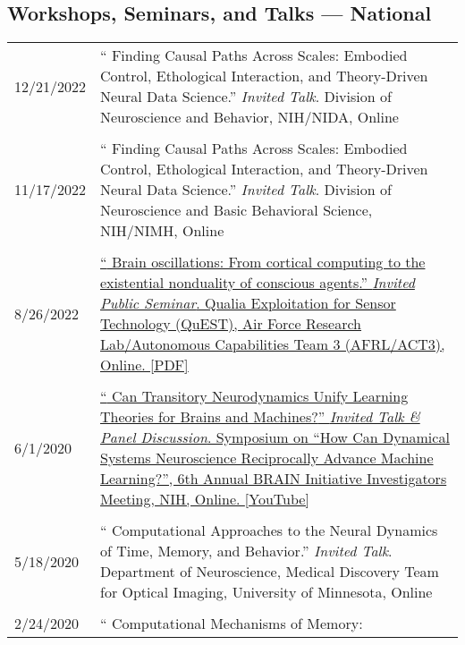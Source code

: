 \documentclass[10pt]{article}
\newcommand{\itemtitle}[1]{{\color{hopkinsblue}\ul{#1}}}
\newcommand{\unpubtitle}[1]{{\color{hopkinsblue} #1}}
\begin{document}
\subsection*{Workshops, Seminars, and Talks --- National}
\label{talks:natl}

\begin{longtable}{@{\hspace{0.2in}}l>{\raggedright\arraybackslash}p{}}
  12/21/2022 \hspace{0.3in} & ``\unpubtitle{Finding Causal Paths Across Scales:
  Embodied Control, Ethological Interaction, and Theory-Driven Neural Data
  Science}.'' \emph{Invited Talk}. Division of Neuroscience and Behavior,
  NIH/NIDA, Online\\
  \tabularnewline
  11/17/2022 \hspace{0.3in} & ``\unpubtitle{Finding Causal Paths Across Scales:
  Embodied Control, Ethological Interaction, and Theory-Driven Neural Data
  Science}.'' \emph{Invited Talk}. Division of Neuroscience and Basic Behavioral
  Science, NIH/NIMH, Online\\
  \tabularnewline
  8/26/2022 \hspace{0.3in} &
  \href{https://jdmonaco.com/files/monaco-2022-afrl-quest-slides.pdf}
  {``\unpubtitle{Brain oscillations: From cortical computing to the existential
  nonduality of conscious agents}.'' \emph{Invited Public Seminar}. Qualia
  Exploitation for Sensor Technology (QuEST), Air Force Research Lab/Autonomous
  Capabilities Team 3 (AFRL/ACT3), Online. \itemtitle{[PDF]}}\\
  \tabularnewline
  6/1/2020 \hspace{0.3in} &
  \href{https://youtu.be/2jy1ENYHRAw?t=902}{``\unpubtitle{Can Transitory
  Neurodynamics Unify Learning Theories for Brains and Machines?}''
  \emph{Invited Talk \& Panel Discussion}. Symposium on ``How Can Dynamical
  Systems Neuroscience Reciprocally Advance Machine Learning?'', 6th Annual
  BRAIN Initiative Investigators Meeting, NIH, Online. \itemtitle{[YouTube]}}\\
  \tabularnewline
  5/18/2020 \hspace{0.3in} & ``\unpubtitle{Computational Approaches to the
  Neural Dynamics of Time, Memory, and Behavior}.'' \emph{Invited Talk}.
  Department of Neuroscience, Medical Discovery Team for Optical Imaging,
  University of Minnesota, Online\\
  \tabularnewline
  2/24/2020 \hspace{0.3in} & ``\unpubtitle{Computational Mechanisms of Memory:
}
\end{longtable}
\end{document}
